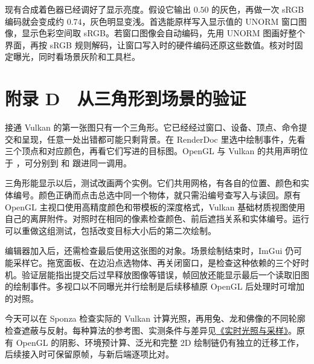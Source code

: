 现有合成着色器已经调好了显示亮度。假设它输出 $0.50$ 的灰色，再做一次 sRGB 编码就会变成约 $0.74$，灰色明显变浅。首选能原样写入显示值的 UNORM 窗口图像，显示色彩空间取 sRGB。若窗口图像会自动编码，先用 UNORM 图画好整个界面，再按 sRGB 规则解码，让窗口写入时的硬件编码还原这些数值。核对时固定曝光，同时看场景灰阶和工具栏。


\clearpage
\section{附录 D　从三角形到场景的验证}\label{app:migration}

接通 Vulkan 的第一张图只有一个三角形。它已经经过窗口、设备、顶点、命令提交和呈现，任意一处出错都可能只剩背景。在 RenderDoc 里选中绘制事件，先看三个顶点和对应颜色，再看它们写进的目标图。OpenGL 与 Vulkan 的共用声明位于 ，可分别到  和  跟进同一调用。

三角形能显示以后，测试改画两个实例。它们共用网格，有各自的位置、颜色和实体编号。颜色正确而点击总选中同一个物体，就只需沿编号查写入与读回。原有 OpenGL 主视口使用高精度颜色和带模板的深度格式，Vulkan 基础材质视图使用自己的离屏附件。对照时在相同的像素检查颜色、前后遮挡关系和实体编号。运行  可以重做这组测试，包括改变目标大小后的第二次绘制。

编辑器加入后，还需检查最后使用这张图的对象。场景绘制结束时，ImGui 仍可能采样它。拖宽面板、在边沿点选物体、再关闭窗口，是检查这种依赖的三个好时机。验证层能指出提交后过早释放图像等错误，帧回放还能显示最后一个读取旧图的绘制事件。多视口以不同曝光并行绘制是后续移植原 OpenGL 后处理时可增加的对照。

今天可以在 Sponza 检查实际的 Vulkan 计算光照，再用兔、龙和佛像的不同轮廓检查遮蔽与反射。每种算法的参考图、实测条件与差异见\href{run:Redflag-Realtime-Lighting.pdf}{《实时光照与采样》}。原有 OpenGL 的阴影、环境预计算、泛光和完整 2D 绘制链仍有独立的迁移工作，后续接入时可保留原帧，与新后端逐项比对。

